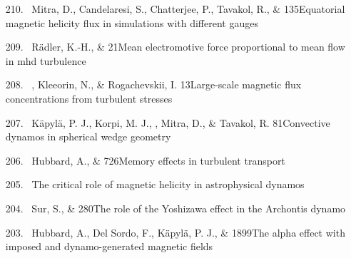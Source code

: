 \begin{itemize}
\item[{210.}~]
Mitra, D., Candelaresi, S., Chatterjee, P., Tavakol, R., \& \Brandenburg{}
{135}{Equatorial magnetic helicity flux in simulations with different gauges}

\item[{209.}~]
R\"adler, K.-H., \& \Brandenburg{}
{21}{Mean electromotive force proportional to mean flow in mhd turbulence}

\item[{208.}~]
\Brandenburg, Kleeorin, N., \& Rogachevskii, I.
{13}{Large-scale magnetic flux concentrations from turbulent stresses}

\item[{207.}~]
K\"apyl\"a, P. J., Korpi, M. J., \Brandenburg, Mitra, D., \& Tavakol, R.
{81}{Convective dynamos in spherical wedge geometry}

\item[{206.}~]
Hubbard, A., \& \Brandenburg{}
{726}{Memory effects in turbulent transport}

\item[{205.}~]
\Brandenburg{}
{The critical role of magnetic helicity in astrophysical dynamos}

\item[{204.}~]
Sur, S., \& \Brandenburg{}
{280}{The role of the Yoshizawa effect in the Archontis dynamo}

\item[{203.}~]
Hubbard, A., Del Sordo, F., K\"apyl\"a, P. J., \& \Brandenburg{}
{1899}{The alpha effect with imposed and dynamo-generated magnetic fields}


\end{itemize}
